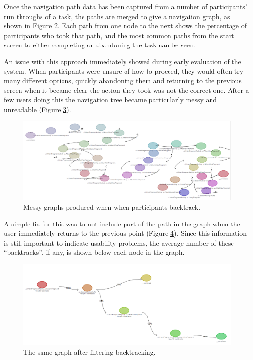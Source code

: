 \begin{figure}
 \centering
 \label{fig:task-navigation}
\end{figure}

Once the navigation path data has been captured from a number of participants' run throughs of a
task, the paths are merged to give a navigation graph, as shown in Figure \ref{fig:task-navigation-tree}. Each path from one node to the next shows the percentage of participants who took that path, and the most
common paths from the start screen to either completing or abandoning the task can be seen.

\begin{figure}
 \centering
 \label{fig:task-navigation-tree}
\end{figure}

An issue with this approach immediately showed during early evaluation of the system. When participants were unsure of how to proceed, they would often try many different options, quickly abandoning them and returning to the previous screen when it became clear the action they took was not the correct one.
After a few users doing this the navigation tree became particularly messy and unreadable 
(Figure \ref{fig:task-navigation-mess}).

\begin{figure}
 \centering
 \includegraphics[width=\textwidth]{images/messy-graph}
 \caption{Messy graphs produced when when participants backtrack.}
 \label{fig:task-navigation-mess}
\end{figure}

A simple fix for this was to not include part of the path in the graph when the user immediately returns
to the previous point (Figure \ref{fig:task-navigation-mess-fixed}). Since this information is still important to indicate usability problems, the average number of these ``backtracks'', if any, is shown below each node in the graph.

\begin{figure}
 \centering
 \includegraphics[width=\textwidth]{images/fixed-graph}
 \caption{The same graph after filtering backtracking.}
 \label{fig:task-navigation-mess-fixed}
\end{figure}